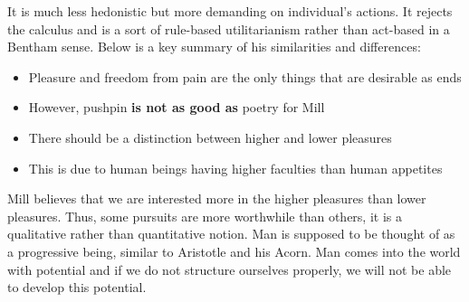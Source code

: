 \documentclass[12pt, letterpaper]{article}
\begin{document}
It is much less hedonistic but more demanding on individual's actions. It rejects the calculus and is a sort of rule-based utilitarianism rather than act-based in a Bentham sense. Below is a key summary of his similarities and differences:
\begin{itemize}
	\item Pleasure and freedom from pain are the only things that are desirable as ends
	\item However, pushpin \textbf{is not as good as} poetry for Mill
	\item There should be a distinction between higher and lower pleasures
	\item This is due to human beings having higher faculties than human appetites
\end{itemize}
Mill believes that we are interested more in the higher pleasures than lower pleasures. Thus, some pursuits are more worthwhile than others, it is a qualitative rather than quantitative notion. Man is supposed to be thought of as a progressive being, similar to Aristotle and his Acorn. Man comes into the world with potential and if we do not structure ourselves properly, we will not be able to develop this potential.
\end{document}

